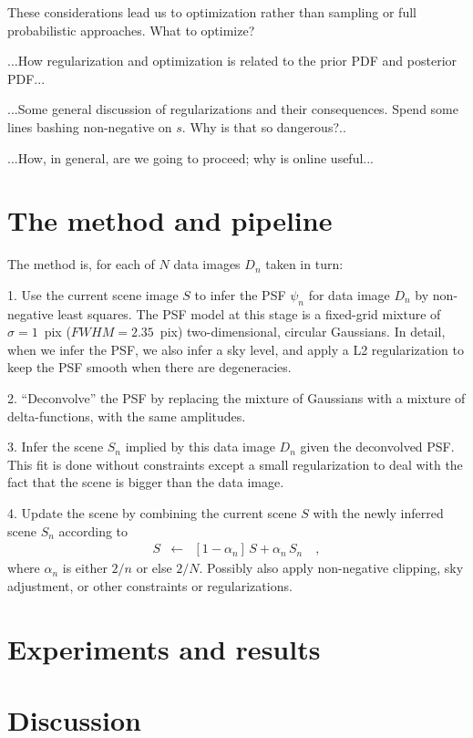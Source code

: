 \documentclass[12pt,preprint]{aastex}
\begin{document}
These considerations lead us to optimization rather than sampling or
full probabilistic approaches.  What to optimize?

...How regularization and optimization is related to the prior PDF and posterior PDF...

...Some general discussion of regularizations and their consequences.
Spend some lines bashing non-negative on $s$.  Why is that so
dangerous?..

...How, in general, are we going to proceed; why is online useful...

\section{The method and pipeline}

The method is, for each of $N$ data images $D_n$ taken in turn:

1. Use the current scene image $S$ to infer the PSF $\psi_n$ for data
image $D_n$ by non-negative least squares.  The PSF model at this
stage is a fixed-grid mixture of $\sigma=1$~pix ($FWHM = 2.35$~pix)
two-dimensional, circular Gaussians.  In detail, when we infer the
PSF, we also infer a sky level, and apply a L2 regularization to keep
the PSF smooth when there are degeneracies.

2. ``Deconvolve'' the PSF by replacing the mixture of Gaussians with a
mixture of delta-functions, with the same amplitudes.

3. Infer the scene $S_n$ implied by this data image $D_n$ given the
deconvolved PSF.  This fit is done without constraints except a small
regularization to deal with the fact that the scene is bigger than the
data image.

4. Update the scene by combining the current scene $S$ with the newly
inferred scene $S_n$ according to
\begin{eqnarray}\displaystyle
S &\leftarrow& [1-\alpha_n]\,S + \alpha_n\,S_n
\quad ,
\end{eqnarray}
where $\alpha_n$ is either $2/n$ or else $2/N$.  Possibly also apply
non-negative clipping, sky adjustment, or other constraints or
regularizations.

\section{Experiments and results}

\section{Discussion}
\end{document}
